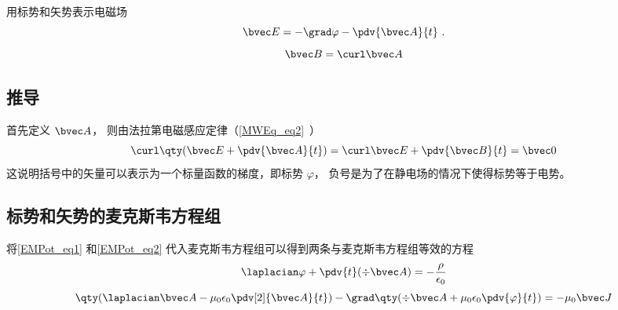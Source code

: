 
\begin{issues}
\issueDraft
\end{issues}


用标势和矢势表示电磁场
\begin{equation}\label{EMPot_eq1}
\bvec E = -\grad \varphi - \pdv{\bvec A}{t}~.
\end{equation}
\begin{equation}\label{EMPot_eq2}
\bvec B = \curl \bvec A
\end{equation}

\subsection{推导}
首先定义 $\bvec A$， 则由法拉第电磁感应定律（\autoref{MWEq_eq2}~）
\begin{equation}
\curl \qty(\bvec E + \pdv{\bvec A}{t}) = \curl \bvec E + \pdv{\bvec B}{t} = \bvec 0
\end{equation}
这说明括号中的矢量可以表示为一个标量函数的梯度，即标势 $\varphi$， 负号是为了在静电场的情况下使得标势等于电势。

\subsection{标势和矢势的麦克斯韦方程组}

将\autoref{EMPot_eq1} 和\autoref{EMPot_eq2} 代入麦克斯韦方程组可以得到两条与麦克斯韦方程组等效的方程
\begin{equation}\label{EMPot_eq4}
\laplacian \varphi + \pdv{t} (\div \bvec A) = -\frac{\rho}{\epsilon_0}
\end{equation}
\begin{equation}\label{EMPot_eq5}
\qty(\laplacian \bvec A - \mu_0\epsilon_0 \pdv[2]{\bvec A}{t}) - \grad \qty(\div \bvec A + \mu_0\epsilon_0 \pdv{\varphi}{t}) = -\mu_0\bvec J
\end{equation}

